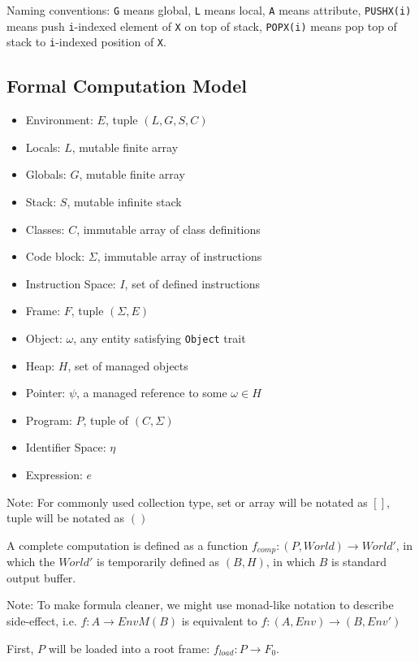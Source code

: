 \documentclass[]{article}
\numberwithin{equation}{section}
\numberwithin{figure}{section}
\numberwithin{table}{section}
\begin{document}
Naming conventions: \texttt{G} means global, \texttt{L} means local,
\texttt{A} means attribute, \texttt{PUSHX(i)} means push
\texttt{i}-indexed element of \texttt{X} on top of stack,
\texttt{POPX(i)} means pop top of stack to \texttt{i}-indexed position
of \texttt{X}.

\subsection{Formal Computation Model}\label{formal-computation-model}

\begin{itemize}
\itemsep1pt\parskip0pt
\item
  Environment: $E$, tuple $(L, G, S, C)$
\item
  Locals: $L$, mutable finite array
\item
  Globals: $G$, mutable finite array
\item
  Stack: $S$, mutable infinite stack
\item
  Classes: $C$, immutable array of class definitions
\item
  Code block: $\Sigma$, immutable array of instructions
\item
  Instruction Space: $I$, set of defined instructions
\item
  Frame: $F$, tuple $(\Sigma, E)$
\item
  Object: $\omega$, any entity satisfying \texttt{Object} trait
\item
  Heap: $H$, set of managed objects
\item
  Pointer: $\psi$, a managed reference to some $\omega \in H$
\item
  Program: $P$, tuple of $(C, \Sigma)$
\item
  Identifier Space: $\eta$
\item
  Expression: $e$
\end{itemize}

Note: For commonly used collection type, set or array will be notated as $[]$, tuple will be notated as $()$

A complete computation is defined as a function
$f_{comp}: (P, World) \rightarrow World'$, in which the $World'$ is
temporarily defined as $(B, H)$, in which $B$ is standard output buffer.

Note: To make formula cleaner, we might use monad-like notation to
describe side-effect, i.e. $f: A \rightarrow EnvM(B)$ is equivalent to
$f: (A, Env) \rightarrow (B, Env')$

First, $P$ will be loaded into a root frame:
$f_{load}: P \rightarrow F_0$.
\end{document}
